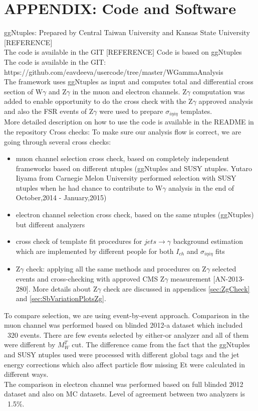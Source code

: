\section{APPENDIX: Code and Software}
\label{sec:Code}


ggNtuples:
Prepared by Central Taiwan University and Kansas State University [REFERENCE]\\
The code is available in the GIT [REFERENCE]
Code is based on ggNtuples\\
The code is available in the GIT: https://github.com/eavdeeva/usercode/tree/master/WGammaAnalysis\\
The framework uses ggNtuples as input and computes total and differential cross section of W$\gamma$ and Z$\gamma$ in the muon and electron channels. Z$\gamma$ computation was added to enable opportunity to do the cross check with the Z$\gamma$ approved analysis and also the FSR events of Z$\gamma$ were used to prepare $\sigma_{i \eta i \eta}$ templates. \\
More detailed description on how to use the code is available in the README in the repository 
Cross checks:
To make sure our analysis flow is correct, we are going through several cross checks:
\begin{itemize}
\item muon channel selection cross check, based on completely independent frameworks based on different ntuples (ggNtuples and
SUSY ntuples. Yutaro Iiyama from Carnegie Melon University performed selection with SUSY ntuples when he had chance to contribute to W$\gamma$ analysis in the end of October,2014 - January,2015)
\item electron channel selection cross check, based on the same ntuples (ggNtuples) but different analyzers
\item cross check of template fit procedures for $jets \rightarrow \gamma$ background estimation which are implemented by different people for both $I_{ch}$ and $\sigma_{i \eta i \eta}$ fits
\item Z$\gamma$ check: applying all the same methods and procedures on
Z$\gamma$ selected events and cross-checking with approved CMS Z$\gamma$ measurement [AN-2013-280]. More details about Z$\gamma$ check are discussed in appendices \ref{sec:ZgCheck} and \ref{sec:SbVariationPlotsZg}. 
\end{itemize}
To compare selection, we are using event-by-event approach. Comparison in the muon channel was performed based on blinded 2012-a dataset which included ~320 events. There are few events selected by either-or analyzer and all of them were different by $M_W^T$ cut. The difference came from the fact that the ggNtuples and SUSY ntuples used were processed with different global tags and the jet energy corrections which also affect particle flow missing Et were calculated in different ways.\\
The comparison in electron channel was performed based on full blinded 2012 dataset and also on MC datasets. Level of agreement between two analyzers is ~1.5\%.\\



